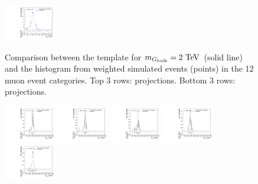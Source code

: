 \begin{figure}[htpb]
  \includegraphics[width=0.2\textwidth]{fig/2Dfit/templateVsReco_VBFGbuToWW2000_r0_MJ_mu_LP_vbf_HDy.pdf}\\
  \caption{
    Comparison between the \VBF\GBulktoWW template for $m_{\GBulk}=2\unit{TeV}$ (solid line) and the histogram from weighted simulated events (points) in the 12 muon event categories.
    Top 3 rows: \MVV projections.
    Bottom 3 rows: \MJ projections.
  }
  \label{fig:1dtemplateVsReco_VBFGbuToWW2000_Run2}
\end{figure}

\begin{figure}[htpb]
  \centering
  \includegraphics[width=0.2\textwidth]{fig/2Dfit/templateVsReco_VBFRadToWW2000_r0_MVV_mu_HP_bb_LDy_linear.pdf}
  \includegraphics[width=0.2\textwidth]{fig/2Dfit/templateVsReco_VBFRadToWW2000_r0_MVV_mu_LP_bb_LDy_linear.pdf}
  \includegraphics[width=0.2\textwidth]{fig/2Dfit/templateVsReco_VBFRadToWW2000_r0_MVV_mu_HP_bb_HDy_linear.pdf}
  \includegraphics[width=0.2\textwidth]{fig/2Dfit/templateVsReco_VBFRadToWW2000_r0_MVV_mu_LP_bb_HDy_linear.pdf}\\
  \includegraphics[width=0.2\textwidth]{fig/2Dfit/templateVsReco_VBFRadToWW2000_r0_MVV_mu_HP_nobb_LDy_linear.pdf}

\end{figure}
